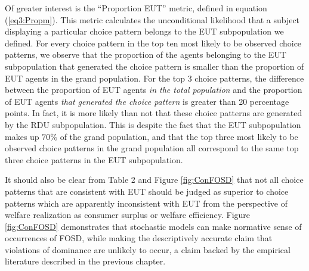 \documentclass[../main.tex]{subfiles}
\begin{document}
Of greater interest is the \enquote{Proportion EUT} metric, defined in equation (\ref{eq3:Propm}).
This metric calculates the unconditional likelihood that a subject displaying a particular choice pattern belongs to the EUT subpopulation we defined.
For every choice pattern in the top ten most likely to be observed choice patterns, we observe that the proportion of the agents belonging to the EUT subpopulation that generated the choice pattern is smaller than the proportion of EUT agents in the grand population.
For the top 3 choice patterns, the difference between the proportion of EUT agents \textit{in the total population} and the proportion of EUT agents \textit{that generated the choice pattern} is greater than 20 percentage points.
In fact, it is more likely than not that these choice patterns are generated by the RDU subpopulation.
This is despite the fact that the EUT subpopulation makes up $70\%$ of the grand population, and that the top three most likely to be observed choice patterns in the grand population all correspond to the same top three choice patterns in the EUT subpopulation.



It should also be clear from Table 2 and Figure \ref{fig:ConFOSD} that not all choice patterns that are consistent with EUT should be judged as superior to choice patterns which are apparently inconsistent with EUT from the perspective of welfare realization as consumer surplus or welfare efficiency.
Figure \ref{fig:ConFOSD} demonstrates that stochastic models can make normative sense of occurrences of FOSD, while making the descriptively accurate claim that violations of dominance are unlikely to occur, a claim backed by the empirical literature described in the previous chapter.
\end{document}

